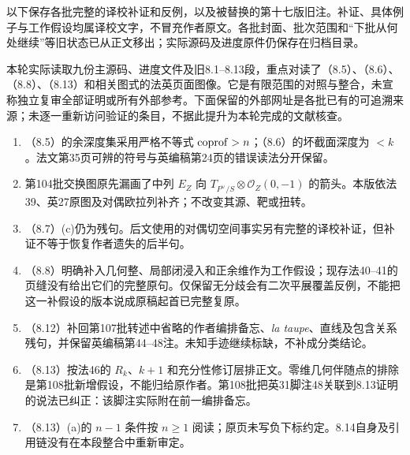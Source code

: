 以下保存各批完整的译校补证和反例，以及被替换的第十七版旧注。补证、具体例子与工作假设均属译校文字，不冒充作者原文。各批封面、批次范围和“下批从何处继续”等旧状态已从正文移出；实际源码及进度原件仍保存在归档目录。

本轮实际读取九份主源码、进度文件及旧8.1--8.13段，重点对读了（8.5）、（8.6）、（8.8）、（8.13）和相关图式的法英页面图像。它是有限范围的对照与整合，未宣称独立复审全部证明或所有外部参考。下面保留的外部网址是各批已有的可追溯来源；未逐一重新访问验证的条目，不据此提升为本轮完成的文献核查。

\begin{enumerate}
\item （8.5）的余深度集采用严格不等式 $\coprof>n$；（8.6）的坏截面深度为 $<k$。法文第35页可辨的符号与英编稿第24页的错误读法分开保留。
\item 第104批交换图原先漏画了中列 $E_Z$ 向 $T_{P^\vee/S}\otimes\mathcal O_Z(0,-1)$ 的箭头。本版依法39、英27原图及对偶欧拉列补齐；不改变其源、靶或扭转。
\item （8.7）(c)仍为残句。后文使用的对偶切空间事实另有完整的译校补证，但补证不等于恢复作者遗失的后半句。
\item （8.8）明确补入几何整、局部闭浸入和正余维作为工作假设；现存法40--41的页缝没有给出它们的完整原句。仅保留无分歧会有二次平展覆盖反例，不能把这一补假设的版本说成原稿起首已完整复原。
\item （8.12）补回第107批转述中省略的作者编排备忘、\emph{la taupe}、直线及包含关系残句，并保留英编稿第44--48注。未知手迹继续标缺，不补成分类结论。
\item （8.13）按法46的 $R_k$、$k+1$ 和充分性修订层排正文。零维几何伴随点的排除是第108批新增假设，不能归给原作者。第108批把英31脚注48关联到8.13证明的说法已纠正：该脚注实际附在前一编排备忘。
\item （8.13）(a)的 $n-1$ 条件按 $n\ge1$ 阅读；原页未写负下标约定。8.14自身及引用链没有在本段整合中重新审定。
\end{enumerate}



\hypertarget{D18-100-notes}{}

\begingroup
\def\PP{\mathbb P}\def\OO{\mathcal O}\def\Ocal{\mathcal O}
\def\F{\mathcal F}\def\G{\mathcal G}\def\N{\mathcal N}
\def\PD{\check P}\def\Pdual{\check P}
\def\Ys{Y^{\mathrm{sing}}}\def\Ysing{Y^{\mathrm{sing}}}
\def\Ds{Y^{\mathrm{sup\,sing}}}\def\Ysup{Y^{\mathrm{sup\,sing}}}
\def\cod{\operatorname{codim}}\def\Sing{\operatorname{Sing}}
\def\depth{\operatorname{depth}}\def\coprof{\operatorname{coprof}}
\def\Ass{\operatorname{Ass}}\def\Supp{\operatorname{Supp}}
\def\Gr{\operatorname{Gr}}\def\Spec{\operatorname{Spec}}\def\Proj{\operatorname{Proj}}


